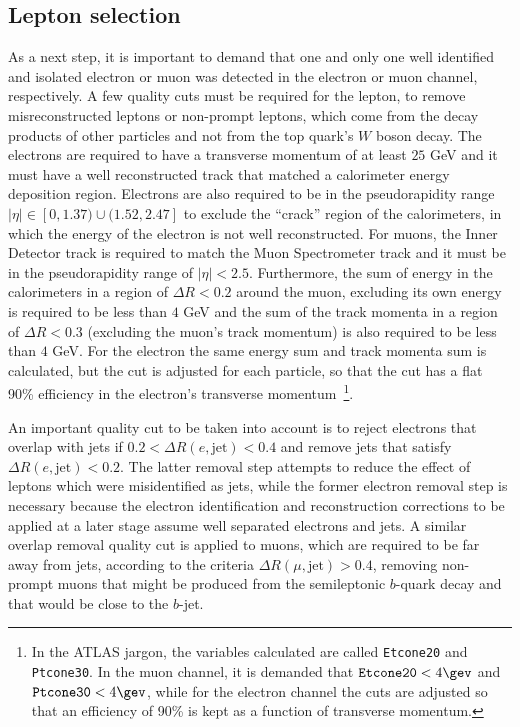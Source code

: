 
\subsection{Lepton selection}

As a next step, it is important to demand that one and only one well identified and isolated
electron or muon was detected in the electron or muon channel, respectively.
A few quality cuts must be required for the lepton, to remove misreconstructed leptons or non-prompt leptons, which come from the
decay products of other
particles and not from the top quark's $W$ boson decay. The electrons are required to have a transverse momentum of at least $25$ GeV and it must have a well
reconstructed track that matched a calorimeter energy deposition region. Electrons are also required to be in the pseudorapidity range
$|\eta| \in [0, 1.37) \cup (1.52, 2.47]$ to exclude the ``crack'' region of the calorimeters, in which the energy of the electron is not well
reconstructed. For muons, the Inner Detector track is 
required to match the Muon Spectrometer track and it must be in the
pseudorapidity range of $|\eta| < 2.5$.
Furthermore, the sum of energy in the calorimeters in a region of $\Delta R < 0.2$ around the muon, excluding its own energy is required to be less than $4$ GeV
and the sum of the track momenta in a region of $\Delta R < 0.3$ (excluding the muon's track momentum) is also required to be less than $4$ GeV.
For the electron the same energy sum and track momenta sum is calculated, but the cut is adjusted for each particle, so that the cut has a flat 90\% efficiency
in the electron's transverse momentum~\footnote{In the ATLAS jargon, the variables calculated are called \texttt{Etcone20} and \texttt{Ptcone30}. In
the muon channel, it is demanded that $\mathtt{Etcone20} < 4\gev$ and $\mathtt{Ptcone30} < 4\gev$, while for the electron channel the cuts are adjusted so that
an efficiency of 90\% is kept as a function of transverse momentum.}.

An important quality cut to be taken into account is to reject electrons that overlap with jets if $0.2 < \Delta R (e, \textrm{jet}) < 0.4$ and remove jets that satisfy
$\Delta R (e, \textrm{jet}) < 0.2$. The latter removal step attempts to reduce the effect of leptons which were misidentified as jets,
while the former electron removal step is necessary because the electron identification and reconstruction corrections to be applied
at a later stage assume well separated electrons and jets. A similar overlap removal quality cut is applied to muons, which are required to be far away from jets, according
to the criteria $\Delta R(\mu, \textrm{jet}) > 0.4$, removing non-prompt muons that might be produced from the semileptonic $b$-quark decay and that would be close to the
$b$-jet.

